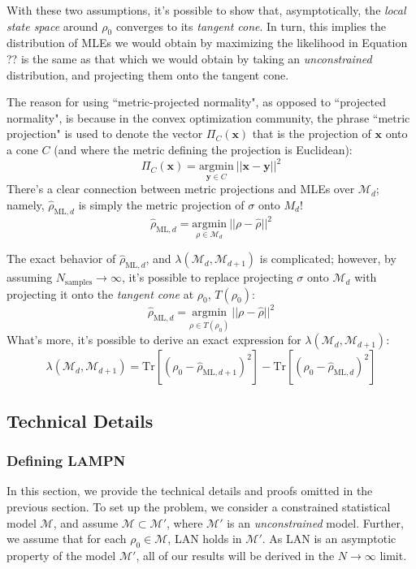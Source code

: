 \documentclass[aps,pra, twocolumn]{revtex4-1}
\newcommand{\bs}[1]{\boldsymbol{#1}}
\newcommand{\M}{\mathcal{M}}
\newcommand{\rhohat}{\hat{\rho}}
\newcommand{\rhoML}[1]{\rhohat_{\scriptscriptstyle{\mathrm{ML},#1}}}
\begin{document}
With these two assumptions, it's possible to show that, asymptotically, the \emph{local state space} around $\rho_{0}$ converges to its \emph{tangent cone}. In turn, this implies the distribution of MLEs we would obtain by maximizing the likelihood in Equation ?? is the same as that which we would obtain by taking an \emph{unconstrained} distribution, and projecting them onto the tangent cone.

The reason for using ``metric-projected normality", as opposed to ``projected normality", is because in the convex optimization community, the phrase ``metric projection" is used to denote the vector $\Pi_{C}(\bs{x})$ that is the projection of $\bs{x}$ onto a cone $C$ (and where the metric defining the projection is Euclidean):
\[\Pi_{C}(\bs{x}) = \underset{\bs{y}\in C}{\text{argmin}}~||\bs{x}  -\bs{y}||^{2}\]
There's a clear connection between metric projections and MLEs over $\M_{d}$; namely, $\rhoML{d}$ is simply the metric projection of $\sigma$ onto $M_{d}$!
\[\rhoML{d} = \underset{\rho \in \M_{d}}{\text{argmin}}~||\rho  -\hat{\rho}||^{2}\]

The exact behavior of $\rhoML{d}$, and $\lambda(\M_{d}, \M_{d+1})$ is complicated; however, by assuming $N_{\mathrm{samples}} \rightarrow \infty$, it's possible to replace projecting $\sigma$ onto $\M_{d}$ with projecting it onto the \emph{tangent cone} at $\rho_{0}$, $T(\rho_{0})$:
\[\rhoML{d} = \underset{\rho \in T(\rho_{0})}{\text{argmin}}~||\rho  -\hat{\rho}||^{2}\]
What's more, it's possible to derive an exact expression for $\lambda(\M_{d}, \M_{d+1})$:
\[\lambda(\M_{d}, \M_{d+1}) = \mathrm{Tr}[(\rho_{0} - \rhoML{d+1})^{2}] -  \mathrm{Tr}[(\rho_{0} - \rhoML{d})^{2}] \]







\subsection{Technical Details}

\subsubsection{Defining LAMPN}

In this section, we provide the technical details and proofs omitted in the previous section. To set up the problem, we consider a constrained statistical model $\M$, and assume $\M \subset \M'$, where $\M'$ is an \emph{unconstrained} model. Further, we assume that for each $\rho_{0} \in \M$, LAN holds in $\M'$. As LAN is an asymptotic property of the model $\M'$, all of our results will be derived in the $N \rightarrow \infty$ limit.
\end{document}
